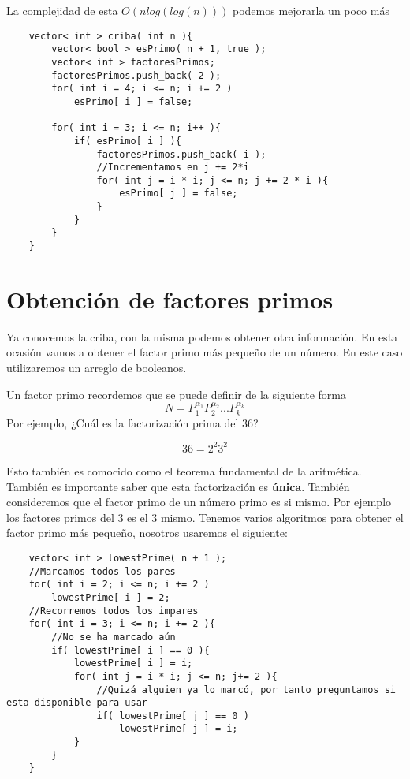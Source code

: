 La complejidad de esta $O( nlog(log(n)))$ podemos mejorarla un poco más 

\begin{lstlisting}
    vector< int > criba( int n ){
        vector< bool > esPrimo( n + 1, true );
        vector< int > factoresPrimos;
        factoresPrimos.push_back( 2 );
        for( int i = 4; i <= n; i += 2 )
            esPrimo[ i ] = false;
        
        for( int i = 3; i <= n; i++ ){
            if( esPrimo[ i ] ){
                factoresPrimos.push_back( i );
                //Incrementamos en j += 2*i
                for( int j = i * i; j <= n; j += 2 * i ){
                    esPrimo[ j ] = false;
                }
            }
        }
    }
\end{lstlisting}

\section{Obtención de factores primos}
Ya conocemos la criba, con la misma podemos obtener otra información. En esta ocasión vamos a obtener el factor primo más pequeño de un número. En este caso utilizaremos un arreglo de booleanos. \newline

Un factor primo recordemos que se puede definir de la siguiente forma
\[
    N = P_{1}^{\alpha_{1}} P_{2}^{\alpha_{2}} ... P_{k}^{\alpha_{k}}
\]
Por ejemplo, ¿Cuál es la factorización prima del 36? \newline

\[ 36 = 2^{2}3^{2} \]

Esto también es comocido como el teorema fundamental de la aritmética. También es importante saber que esta factorización es \textbf{única}. \newline
También consideremos que el factor primo de un número primo es si mismo. Por ejemplo los factores primos del 3 es el 3 mismo. \newline
Tenemos varios algoritmos para obtener el factor primo más pequeño, nosotros usaremos el siguiente:
\begin{lstlisting}
    vector< int > lowestPrime( n + 1 );
    //Marcamos todos los pares 
    for( int i = 2; i <= n; i += 2 )
        lowestPrime[ i ] = 2;
    //Recorremos todos los impares 
    for( int i = 3; i <= n; i += 2 ){
        //No se ha marcado aún
        if( lowestPrime[ i ] == 0 ){
            lowestPrime[ i ] = i;
            for( int j = i * i; j <= n; j+= 2 ){
                //Quizá alguien ya lo marcó, por tanto preguntamos si esta disponible para usar
                if( lowestPrime[ j ] == 0 )
                    lowestPrime[ j ] = i;
            }
        }
    }
\end{lstlisting}

